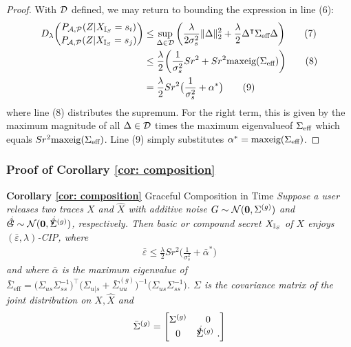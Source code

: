 \begin{proof}
With $\mathcal{D}$ defined, we may return to bounding the expression in line (6): 
\begin{align}
	D_\lambda \binom{P_{\mathcal{A}, \mathcal{P}}(Z | {X_{\mathbb{I}_S}} = s_i)}{P_{\mathcal{A}, \mathcal{P}}(Z | {X_{\mathbb{I}_S}} = s_j)}
	&\leq \sup_{\Delta \in \mathcal{D}} \bigg( \frac{\lambda}{2 \sigma_s^2}  \| \Delta \|_2^2 
	+  \frac{\lambda}{2} \Delta^\intercal \Sigma_{\text{eff}} \Delta \bigg) \tag{7} \\
	&\leq  \frac{\lambda}{2}\bigg( \frac{1}{\sigma_s^2} S r^2 + S r^2 \text{maxeig}(\Sigma_{\text{eff}}) \bigg) \tag{8} \\
	&= \frac{\lambda}{2} S r^2 \big( \frac{1}{\sigma_s^2} + \alpha^* \big) \tag{9}
\end{align}
where line (8) distributes the supremum. For the right term, this is given by the maximum magnitude of all $\Delta \in \mathcal{D}$ times the maximum eigenvalueof $\Sigma_{\text{eff}}$ which equals $S r^2 \text{maxeig}(\Sigma_{\text{eff}})$. Line (9) simply substitutes $\alpha^* = \text{maxeig}(\Sigma_{\text{eff}})$. 

\end{proof}

\subsubsection{Proof of Corollary \ref{cor: composition}}
\textbf{Corollary \ref{cor: composition}}
Graceful Composition in Time
\textit{
	Suppose a user releases two traces $X$ and $\hat{X}$ with additive noise $G \sim \mathcal{N}(\mathbf{0}, \Sigma^{(g)})$ and $\hat{G} \sim \calN(\mathbf{0}, \hat{\Sigma}^{(g)})$, respectively. Then basic or compound secret ${X_{\mathbb{I}_S}}$ of $X$ enjoys $(\bar{\varepsilon}, \lambda)$-CIP, where 
	\begin{align*}
		\bar{\varepsilon} \leq \frac{\lambda}{2} S r^2 \Big(  \frac{1 }{\sigma_s^2} + \bar{\alpha}^*  \Big) 
	\end{align*}
	and where $\bar{\alpha}$ is the maximum eigenvalue of $\bar{\Sigma}_{\text{eff}} = \big(\Sigma_{us} \Sigma_{ss}^{-1}\big)^\intercal \big( \Sigma_{u | s} + \bar{\Sigma}_{uu}^{(g)} \big)^{-1} \big(\Sigma_{us} \Sigma_{ss}^{-1}\big)$. $\Sigma$ is the covariance matrix of the joint distribution on $X, \hat{X}$ and 
	\begin{align*}
	\bar{\Sigma}^{(g)} =
		\begin{bmatrix}
			 \Sigmag & 0 \\
			 0 &  \hat{\Sigma}^{(g)} \ .
		\end{bmatrix}
	\end{align*}
}


